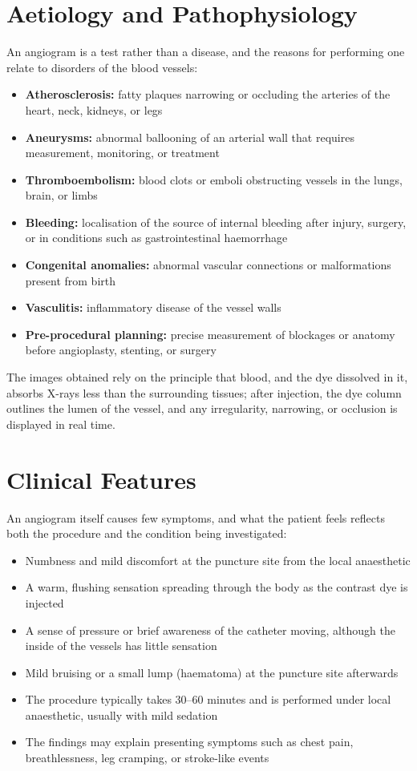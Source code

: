 \section*{Aetiology and Pathophysiology}
An angiogram is a test rather than a disease, and the reasons for performing one relate to disorders of the blood vessels:

\begin{itemize}
    \item \textbf{Atherosclerosis:} fatty plaques narrowing or occluding the arteries of the heart, neck, kidneys, or legs
    \item \textbf{Aneurysms:} abnormal ballooning of an arterial wall that requires measurement, monitoring, or treatment
    \item \textbf{Thromboembolism:} blood clots or emboli obstructing vessels in the lungs, brain, or limbs
    \item \textbf{Bleeding:} localisation of the source of internal bleeding after injury, surgery, or in conditions such as gastrointestinal haemorrhage
    \item \textbf{Congenital anomalies:} abnormal vascular connections or malformations present from birth
    \item \textbf{Vasculitis:} inflammatory disease of the vessel walls
    \item \textbf{Pre-procedural planning:} precise measurement of blockages or anatomy before angioplasty, stenting, or surgery
\end{itemize}

The images obtained rely on the principle that blood, and the dye dissolved in it, absorbs X-rays less than the surrounding tissues; after injection, the dye column outlines the lumen of the vessel, and any irregularity, narrowing, or occlusion is displayed in real time.

\section*{Clinical Features}
An angiogram itself causes few symptoms, and what the patient feels reflects both the procedure and the condition being investigated:

\begin{itemize}
    \item Numbness and mild discomfort at the puncture site from the local anaesthetic
    \item A warm, flushing sensation spreading through the body as the contrast dye is injected
    \item A sense of pressure or brief awareness of the catheter moving, although the inside of the vessels has little sensation
    \item Mild bruising or a small lump (haematoma) at the puncture site afterwards
    \item The procedure typically takes 30--60 minutes and is performed under local anaesthetic, usually with mild sedation
    \item The findings may explain presenting symptoms such as chest pain, breathlessness, leg cramping, or stroke-like events
\end{itemize}

